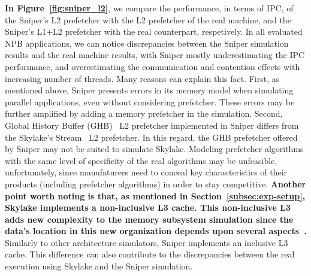 \documentclass[AMA,final,STIX1COL]{WileyNJD-v2}
\newcommand\new[1]{{\color{red}\textbf{#1}}}
\newcommand{\vsg}[1]{\textcolor{blue}{\bfseries \ul{vsgirelli: #1} }\vspace{0.2cm}}
\begin{document}
\textbf{In Figure~\ref{fig:sniper_l2}}, we compare the performance, in terms of IPC, of the Sniper's L2 prefetcher with the L2 prefetcher of the real machine, and the Sniper's L1+L2 prefetcher with the real counterpart, respetively.
In all evaluated NPB applications, we can notice discrepancies between the Sniper simulation results and the real machine results, with Sniper mostly underestimating the IPC performance, and overestimating the communication and contention effects with increasing number of threads.
Many reasons can explain this fact. 
First, as mentioned above, Sniper presents errors in its memory model when simulating parallel applications, even without considering prefetcher. 
These errors may be further amplified by adding a memory prefetcher in the simulation. 
Second, Global History Buffer (GHB)~\cite{nesbit2004data} L2 prefetcher implemented in Sniper differs from the Skylake's Stream~\cite{intelmanual} L2 prefetcher. 
In this regard, the GHB prefetcher offered by Sniper may not be suited to simulate Skylake. 
Modeling prefetcher algorithms with the same level of specificity of the real algorithms may be unfeasible, unfortunately, since manufaturers need to conceal key characteristics of their products (including prefetcher algorithms) in order to stay competitive.
\new{Another point worth noting is that, as mentioned in Section~\ref{subsec:exp-setup}, Skylake implements a non-inclusive L3 cache.
This non-inclusive L3 adds new complexity to the memory subsystem simulation since the data's location in this new organization depends upon several aspects~\cite{intelmanual}.}
Similarly to other architecture simulators, Sniper implements an inclusive L3 cache. This difference can also contribute to the discrepancies between the real execution using Skylake and the Sniper simulation.

\end{document}
